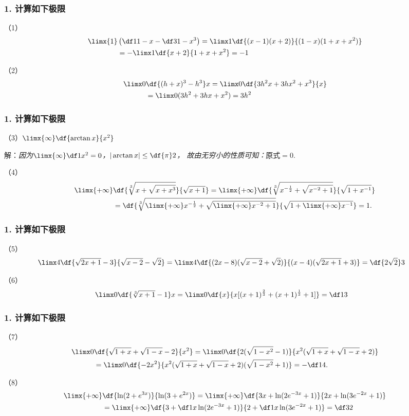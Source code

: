 \begin{frame}[t]\frametitle{1. 计算如下极限}
\large
（1）
\begin{align*}
	\limx{1}&\left(\df1{1-x}-\df3{1-x^3}\right)
	=\limx1\df{(x-1)(x+2)}{(1-x)(1+x+x^2)}\\
	&=-\limx1\df{x+2}{1+x+x^2}=-1
\end{align*}

（2）
\begin{align*}
	\limx0&\df{(h+x)^3-h^3}x
	=\limx0\df{3h^2x+3hx^2+x^3}{x}\\
	&=\limx0(3h^2+3hx+x^2)=3h^2
\end{align*}
\end{frame}

\begin{frame}[t]\frametitle{1. 计算如下极限}
\large
（3）$\limx{\infty}\df{\arctan x}{x^2}$

解：{\it 因为$\limx{\infty}\df1{x^2}=0$，$|\arctan x|\leq\df{\pi}2$，
故由无穷小的性质可知：$\mbox{原式}=0.$}

\bs
（4）
\begin{align*}
	\limx{+\infty}&\df{\sqrt[3]{x+\sqrt{x+x^3}}}{\sqrt{x+1}}
	=\limx{+\infty}\df{\sqrt[3]{x^{-\frac12}
	+\sqrt{x^{-2}+1}}}{\sqrt{1+x^{-1}}}\\
	&=\df{\sqrt[3]{\limx{+\infty}x^{-\frac12}
	+\sqrt{\limx{+\infty}x^{-2}+1}}}{\sqrt{1+\limx{+\infty}x^{-1}}}=1.
\end{align*}
\end{frame}

\begin{frame}[t]\frametitle{1. 计算如下极限}
\large
（5）
\begin{align*}
	\limx4&\df{\sqrt{2x+1}-3}{\sqrt{x-2}-\sqrt2}
	=\limx4\df{(2x-8)(\sqrt{x-2}+\sqrt2)}{(x-4)(\sqrt{2x+1}+3)}
	=\df{2\sqrt2}3
\end{align*}

（6）
\begin{align*}
	\limx0&\df{\sqrt[3]{x+1}-1}x
	=\limx0\df{x}{x[(x+1)^{\frac{2}{3}}
	+(x+1)^{\frac{1}{3}}+1]}
	=\df13
\end{align*}
\end{frame}

\begin{frame}[t]\frametitle{1. 计算如下极限}
\large
（7）
\begin{align*}
	\limx0&\df{\sqrt{1+x}+\sqrt{1-x}-2}{x^2}
	=\limx0\df{2(\sqrt{1-x^2}-1)}
	{x^2(\sqrt{1+x}+\sqrt{1-x}+2)}\\
	&=\limx0\df{-2x^2}{x^2(\sqrt{1+x}+\sqrt{1-x}+2)
	(\sqrt{1-x^2}+1)}=-\df14.
\end{align*}

（8）
\begin{align*}
	\limx{+\infty}&\df{\ln(2+e^{3x})}{\ln(3+e^{2x})}
	=\limx{+\infty}
	\df{3x+\ln(2e^{-3x}+1)}{2x+\ln(3e^{-2x}+1)}\\
	&=\limx{+\infty}
	\df{3+\df1x\ln(2e^{-3x}+1)}{2+\df1x\ln(3e^{-2x}+1)}
	=\df32
\end{align*}
\end{frame}

